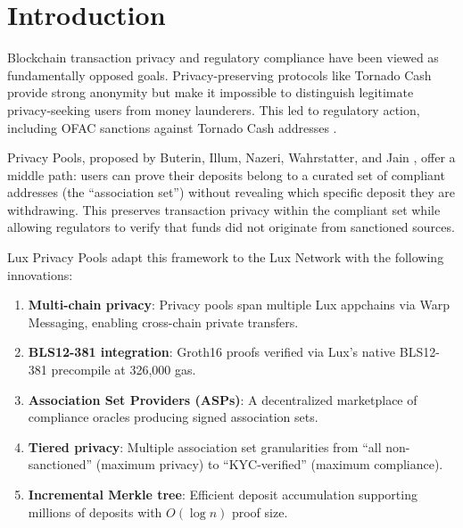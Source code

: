 \section{Introduction}


Blockchain transaction privacy and regulatory compliance have been viewed as fundamentally opposed goals. Privacy-preserving protocols like Tornado Cash \cite{pertsev2019tornado} provide strong anonymity but make it impossible to distinguish legitimate privacy-seeking users from money launderers. This led to regulatory action, including OFAC sanctions against Tornado Cash addresses \cite{ofac2022tornado}.

Privacy Pools, proposed by Buterin, Illum, Nazeri, Wahrstatter, and Jain \cite{buterin2023privacy}, offer a middle path: users can prove their deposits belong to a curated set of compliant addresses (the ``association set'') without revealing which specific deposit they are withdrawing. This preserves transaction privacy within the compliant set while allowing regulators to verify that funds did not originate from sanctioned sources.

Lux Privacy Pools adapt this framework to the Lux Network with the following innovations:

\begin{enumerate}[label=(\roman*)]
    \item \textbf{Multi-chain privacy}: Privacy pools span multiple Lux appchains via Warp Messaging, enabling cross-chain private transfers.
    \item \textbf{BLS12-381 integration}: Groth16 proofs verified via Lux's native BLS12-381 precompile at 326,000 gas.
    \item \textbf{Association Set Providers (ASPs)}: A decentralized marketplace of compliance oracles producing signed association sets.
    \item \textbf{Tiered privacy}: Multiple association set granularities from ``all non-sanctioned'' (maximum privacy) to ``KYC-verified'' (maximum compliance).
    \item \textbf{Incremental Merkle tree}: Efficient deposit accumulation supporting millions of deposits with $O(\log n)$ proof size.
\end{enumerate}


